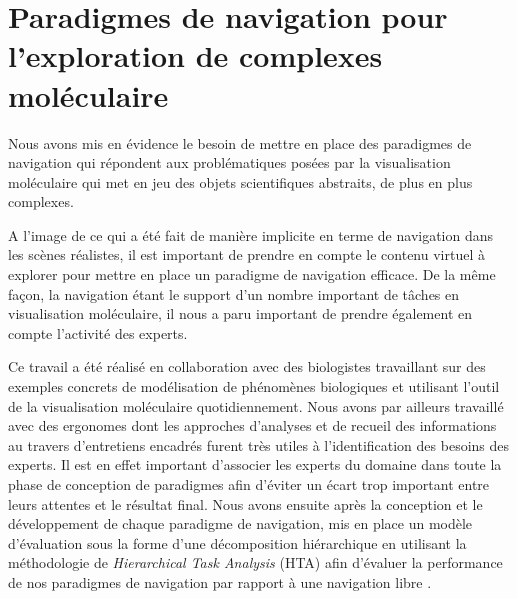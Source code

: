 \section{Paradigmes de navigation pour l'exploration de complexes moléculaire}

Nous avons mis en évidence le besoin de mettre en place des paradigmes de navigation qui répondent aux problématiques posées par la visualisation moléculaire qui met en jeu des objets scientifiques abstraits, de plus en plus complexes.



A l'image de ce qui a été fait de manière implicite en terme de navigation dans les scènes réalistes, il est  important de prendre en compte le contenu virtuel à explorer pour mettre en place un paradigme de navigation efficace. De la même façon, la navigation étant le support d'un nombre important de tâches en visualisation moléculaire, il nous a paru important de prendre également en compte l'activité des experts. 


Ce travail a été réalisé en collaboration avec des biologistes travaillant sur des exemples concrets de modélisation de phénomènes biologiques et utilisant l'outil de la visualisation moléculaire quotidiennement. Nous avons par ailleurs travaillé avec des ergonomes dont les approches d'analyses et de recueil des informations au travers d'entretiens encadrés furent très utiles à l'identification des besoins des experts. Il est en effet important d'associer les experts du domaine dans toute la phase de conception de paradigmes afin d'éviter un écart trop important entre leurs attentes et le résultat final. Nous avons ensuite après la conception et le développement de chaque paradigme de navigation, mis en place un modèle d'évaluation sous la forme d'une décomposition hiérarchique en utilisant la méthodologie de \textit{Hierarchical Task Analysis} (HTA) afin d'évaluer la performance de nos paradigmes de navigation par rapport à une navigation libre \cite{annett2003hierarchical}.

